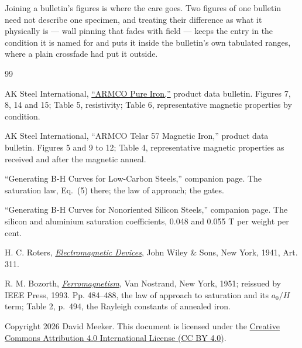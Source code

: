 \documentclass[
  11pt,
]{article}
\begin{document}
Joining a bulletin's figures is where the care goes. Two figures of one bulletin need not describe one specimen, and treating their difference as what it physically is --- wall pinning that fades with field --- keeps the entry in the condition it is named for and puts it inside the bulletin's own tabulated ranges, where a plain crossfade had put it outside.

\begin{thebibliography}{99}\label{references}

 AK Steel International, \href{https://www.aksteel.nl/files/downloads/clf_productdata__armco_pure_iron_pdb_euro_final_072022_92.pdf}{``ARMCO Pure Iron,''} product data bulletin. Figures 7, 8, 14 and 15; Table 5, resistivity; Table 6, representative magnetic properties by condition.

 AK Steel International, ``ARMCO Telar 57 Magnetic Iron,'' product data bulletin. Figures 5 and 9 to 12; Table 4, representative magnetic properties as received and after the magnetic anneal.

 ``Generating B-H Curves for Low-Carbon Steels,'' companion page. The saturation law, Eq.~(5) there; the law of approach; the gates.

 ``Generating B-H Curves for Nonoriented Silicon Steels,'' companion page. The silicon and aluminium saturation coefficients, 0.048 and 0.055 T per weight per cent.

 H. C. Roters, \href{https://archive.org/details/in.ernet.dli.2015.205551}{\emph{Electromagnetic Devices}}, John Wiley \& Sons, New York, 1941, Art. 311.

 R. M. Bozorth, \href{https://doi.org/10.1109/9780470544624}{\emph{Ferromagnetism}}, Van Nostrand, New York, 1951; reissued by IEEE Press, 1993. Pp. 484--488, the law of approach to saturation and its \(a_0/H\) term; Table 2, p.~494, the Rayleigh constants of annealed iron.

\end{thebibliography}

\noindent Copyright 2026 David Meeker. This document is licensed under the \href{https://creativecommons.org/licenses/by/4.0/}{Creative Commons Attribution 4.0 International License (CC BY 4.0)}.
\end{document}
